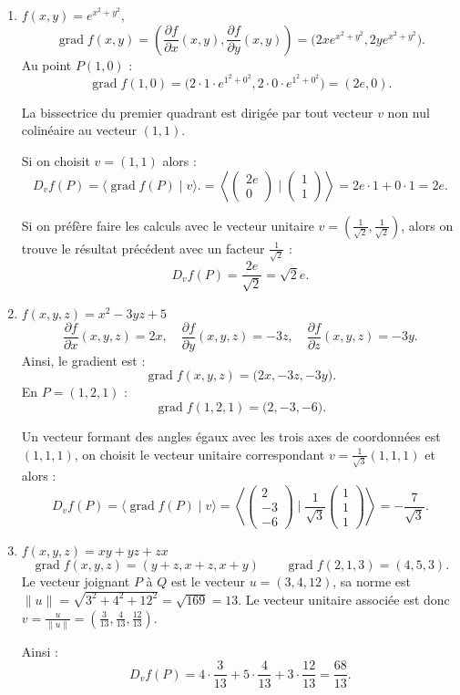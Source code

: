 \documentclass[11pt,a4paper]{article}
\theoremstyle{exostyle}
\newcommand{\grad}{\operatorname{grad}} %
\begin{document}
\begin{enumerate}
	\item $f(x,y)=e^{x^2+y^2}$,
	\[
	\grad f(x, y) 
	= \left( \frac{\partial f}{\partial x}(x,y), \frac{\partial f}{\partial y}(x,y) \right)
	= \big( 2x e^{x^2 + y^2}, 2y e^{x^2 + y^2} \big).
	\]
	Au point $P(1,0)$ :
	\[
	\grad f(1, 0) 
	= \big( 2 \cdot 1 \cdot e^{1^2 + 0^2}, 2 \cdot 0 \cdot e^{1^2 + 0^2} \big) = ( 2e, 0 ).
	\]
	
	La bissectrice du premier quadrant est dirigée par tout vecteur $v$ non nul colinéaire au vecteur $(1,1)$. 
	
	Si on choisit $v = (1,1)$ alors :
	\[
	D_v f(P) 
	= \langle \grad f (P) \mid v \rangle.
	= \left\langle \begin{pmatrix}2e \\ 0 \end{pmatrix} \mid \begin{pmatrix}1 \\ 1 \end{pmatrix} \right\rangle
	= 2e \cdot 1 + 0 \cdot 1 = 2e.
	\]
	
	Si on préfère faire les calculs avec le vecteur unitaire $v = \left(\frac{1}{\sqrt2},\frac{1}{\sqrt2}\right)$, alors on trouve le résultat précédent avec un facteur $\frac{1}{\sqrt2}$ :
	\[
	D_v f(P) = \frac{2e}{\sqrt2} = \sqrt{2} e.
	\]
	
	\item $f(x,y,z)=x^2-3yz+5$ 
	\[
	\frac{\partial f}{\partial x}(x,y,z) = 2x, \quad \frac{\partial f}{\partial y}(x,y,z) = -3z, \quad \frac{\partial f}{\partial z}(x,y,z) = -3y.
	\]
	Ainsi, le gradient est :
	\[
	\grad f(x, y, z) 
	=\big( 2x, -3z, -3y \big).
	\]
	En $P=(1,2,1)$ :
	\[
	\grad f(1, 2, 1) = \big( 2, -3, -6 \big).
	\]
	
	Un vecteur formant des angles égaux avec les trois axes de 
	coordonnées est $(1,1,1)$, on choisit le vecteur unitaire correspondant $v = \frac{1}{\sqrt3}(1,1,1)$ et alors :
	\[
	D_v f(P) 
	= \langle \grad f (P) \mid v \rangle
	= \left\langle \begin{pmatrix}2 \\ -3 \\ -6 \end{pmatrix} \mid \frac{1}{\sqrt3}\begin{pmatrix}1 \\ 1 \\ 1 \end{pmatrix} \right\rangle
	= -\frac{7}{\sqrt{3}}.
	\]
	
	\item $f(x,y,z)=xy+yz+zx$ 
	\[
	\grad f(x, y, z) =  ( y + z, x + z, x + y ) \qquad \grad f(2,1,3) = (4, 5, 3).
	\]
	Le vecteur joignant $P$ à $Q$ est le vecteur $u = (3, 4, 12)$, sa norme est 
	$\| u \| = \sqrt{3^2 + 4^2 + 12^2} = \sqrt{169} = 13$. Le vecteur unitaire associée est donc $v = \frac{u}{\|u\|} = \left( \frac{3}{13}, \frac{4}{13}, \frac{12}{13} \right)$.

	Ainsi :
	\[
	D_v f(P) =
	4 \cdot \frac{3}{13} + 5 \cdot \frac{4}{13} + 3 \cdot \frac{12}{13}
	= \frac{68}{13}.
	\]
\end{enumerate}
\end{document}

